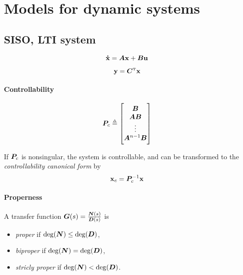 \section{Models for dynamic systems}

\subsection{SISO, LTI system}
\begin{equation}
	\boldsymbol{\mathbf{\dot{x}}}
	=
	\bm{A} \boldsymbol{\mathbf{x}}
	+
	\bm{B} \boldsymbol{\mathbf{u}}
\end{equation}

\begin{equation}
	\boldsymbol{\mathbf{y}}
	=
	\bm{C}^{\scriptscriptstyle \mathrm{T}} \boldsymbol{\mathbf{x}}
\end{equation}

\paragraph{Controllability}
\begin{equation}
	\bm{P}_c
	\triangleq
	\begin{bmatrix}
		\bm{B} \\ \bm{AB} \\ \vdots \\ \bm{A}^{n-1}\bm{B}
	\end{bmatrix}
\end{equation}

If $\bm{P}_c$ is nonsingular, the system is controllable, and can be transformed to the \emph{controllability canonical form} by
\begin{equation}
	\boldsymbol{\mathbf{x}}_c
	=
	\bm{P}_c^{-1} \boldsymbol{\mathbf{x}}
\end{equation}

\paragraph{Properness}
A transfer function $\bm{G}(s) = \frac{\bm{N}(s)}{\bm{D}(s)}$ is
\begin{itemize}
	\item \emph{proper} if $\deg(\bm{N}) \leq \deg(\bm{D})$,
	\item \emph{biproper} if $\deg(\bm{N}) = \deg(\bm{D})$,
	\item \emph{stricly proper} if $\deg(\bm{N}) < \deg(\bm{D})$.
\end{itemize}